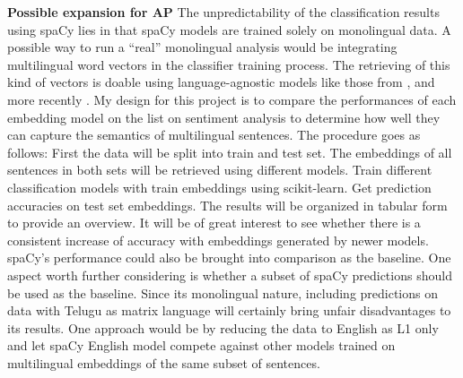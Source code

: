 \documentclass[12pt]{article}
\begin{document}
\textbf{Possible expansion for AP} The unpredictability of the classification results using spaCy lies in that spaCy models are trained solely on monolingual data. A possible way to run a ``real'' monolingual analysis would be integrating multilingual word vectors in the classifier training process. The retrieving of this kind of vectors is doable using language-agnostic models like those from \citet{smith2017multilang}, \citet{devlin2018mbert} and more recently \citet{conneau2019roberta}. My design for this project is to compare the performances of each embedding model on the list on sentiment analysis to determine how well they can capture the semantics of multilingual sentences. The procedure goes as follows: First the data will be split into train and test set. The embeddings of all sentences in both sets will be retrieved using different models. Train different classification models with train embeddings using scikit-learn. Get prediction accuracies on test set embeddings. The results will be organized in tabular form to provide an overview. It will be of great interest to see whether there is a consistent increase of accuracy with embeddings generated by newer models. spaCy's performance could also be brought into comparison as the baseline. One aspect worth further considering is whether a subset of spaCy predictions should be used as the baseline. Since its monolingual nature, including predictions on data with Telugu as matrix language will certainly bring unfair disadvantages to its results. One approach would be by reducing the data to English as L1 only and let spaCy English model compete against other models trained on multilingual embeddings of the same subset of sentences.







\vspace{20pt}

{
    
    }
\end{document}
